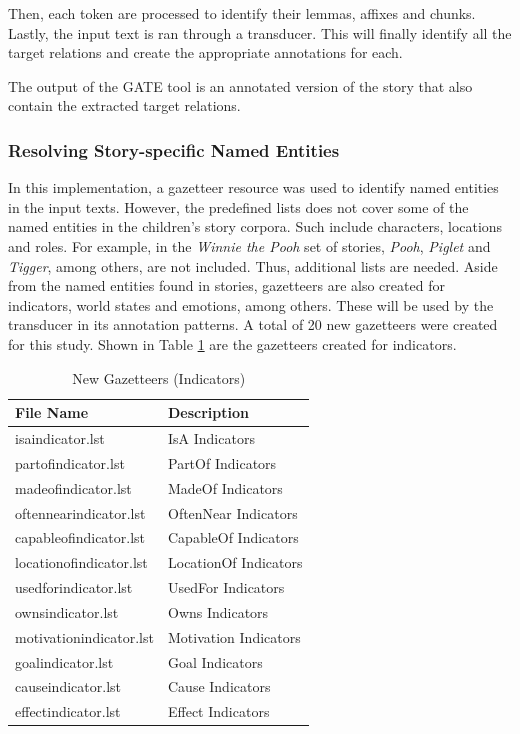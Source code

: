 Then, each token are processed to identify their lemmas, affixes and chunks. Lastly, the input text is ran through a transducer. This will finally identify all the target relations and create the appropriate annotations for each.

The output of the GATE tool is an annotated version of the story that also contain the extracted target relations.

\subsubsection{Resolving Story-specific Named Entities}
\label{sec:gazetteer}

In this implementation, a gazetteer resource was used to identify named entities in the input texts. However, the predefined lists does not cover some of the named entities in the children's story corpora. Such include characters, locations and roles. For example, in the \textit{Winnie the Pooh} set of stories, \textit{Pooh}, \textit{Piglet} and \textit{Tigger}, among others, are not included. Thus, additional lists are needed. Aside from the named entities found in stories, gazetteers are also created for indicators, world states and emotions, among others. These will be used by the transducer in its annotation patterns. A total of 20 new gazetteers were created for this study. Shown in Table \ref{tab:newgazetteersind} are the gazetteers created for indicators.

\begin{table}[H]   %
\centering
\caption{New Gazetteers (Indicators)} \vspace{0.25em}
\begin{tabular}{|p{5cm}|p{5cm}|} \hline
File Name & Description \\ \hline
isaindicator.lst			& IsA Indicators \\ \hline
partofindicator.lst			& PartOf Indicators \\ \hline
madeofindicator.lst			& MadeOf Indicators \\ \hline
oftennearindicator.lst		& OftenNear Indicators \\ \hline
capableofindicator.lst		& CapableOf Indicators \\ \hline
locationofindicator.lst		& LocationOf Indicators \\ \hline
usedforindicator.lst		& UsedFor Indicators \\ \hline
ownsindicator.lst 			& Owns Indicators \\ \hline
motivationindicator.lst		& Motivation Indicators \\ \hline
goalindicator.lst			& Goal Indicators \\ \hline
causeindicator.lst			& Cause Indicators \\ \hline
effectindicator.lst			& Effect Indicators \\ \hline
\end{tabular}
\label{tab:newgazetteersind}
\end{table}

